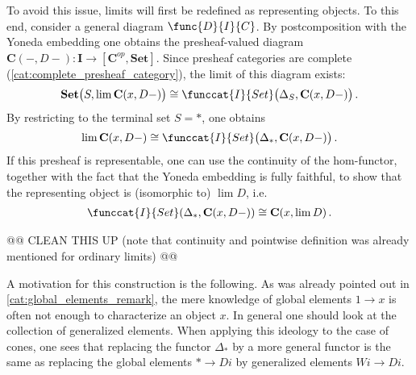     To avoid this issue, limits will first be redefined as representing objects. To this end, consider a general diagram $\func{D}{I}{C}$. By postcomposition with the Yoneda embedding one obtains the presheaf-valued diagram $\mathbf{C}(-,D-):\mathbf{I}\rightarrow[\mathbf{C}^{op}, \mathbf{Set}]$. Since presheaf categories are complete (\cref{cat:complete_presheaf_category}), the limit of this diagram exists: \[\mathbf{Set}\big(S,\lim\mathbf{C}(x,D-)\big)\cong\funccat{I}{Set}\bigl(\Delta_S,\mathbf{C}(x,D-)\bigr)\,.\] By restricting to the terminal set $S=\ast$, one obtains \[\lim\mathbf{C}(x,D-)\cong\funccat{I}{Set}\bigl(\Delta_\ast,\mathbf{C}(x,D-)\bigr)\,.\] If this presheaf is representable, one can use the continuity of the hom-functor, together with the fact that the Yoneda embedding is fully faithful, to show that the representing object is (isomorphic to) $\lim D$, i.e.
    \begin{gather}
        \funccat{I}{Set}(\Delta_\ast,\mathbf{C}(x,D-))\cong\mathbf{C}(x,\lim D)\,.
    \end{gather}

    @@ CLEAN THIS UP (note that continuity and pointwise definition was already mentioned for ordinary limits) @@


    \begin{remark}
        A motivation for this construction is the following. As was already pointed out in \cref{cat:global_elements_remark}, the mere knowledge of global elements $1\rightarrow x$ is often not enough to characterize an object $x$. In general one should look at the collection of generalized elements. When applying this ideology to the case of cones, one sees that replacing the functor $\Delta_\ast$ by a more general functor is the same as replacing the global elements $\ast\rightarrow Di$ by generalized elements $Wi\rightarrow Di$.
    \end{remark}


